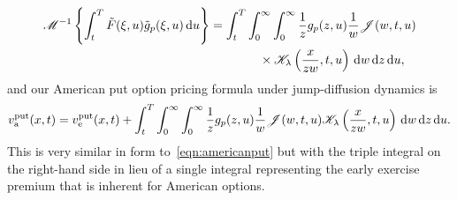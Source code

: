         	\begin{align*}
        		\mathscr M^{-1}\left\{ \int_t^T \tilde{F}(\xi,u)\tilde{g}_p(\xi,u) \, \mathrm d u \right\} &= \int_t^T \int_0^\infty \int_0^\infty \frac{1}{z}g_p(z,u) \frac{1}{w}\mathscr J(w,t,u) \\
        		 & \qquad \qquad \times \mathscr K_\lambda\left(\frac{x}{zw},t,u\right) \, \mathrm d w \, \mathrm d z \, \mathrm d u,
        	\end{align*}
        	and our American put option pricing formula under jump-diffusion dynamics is 
        	\begin{equation}
        		\label{eqn:amerJumpPut}
        		v_{\text{a}}^{\text{put}}(x,t) = v_{\text{e}}^{\text{put}}(x,t) + \int_t^T \int_0^\infty \int_0^\infty \frac{1}{z}g_p(z,u) \frac{1}{w}\mathscr J(w,t,u)\mathscr K_\lambda\left(\frac{x}{zw},t,u\right) \, \mathrm d w \, \mathrm d z \, \mathrm d u.
        	\end{equation}
        	This is very similar in form to~\eqref{eqn:americanput} but with the triple integral on the right-hand side in lieu of a single integral representing the early exercise premium that is inherent for American options.
        	
